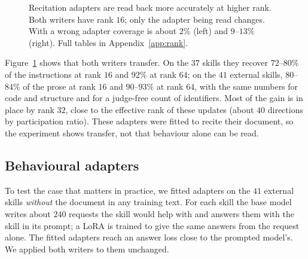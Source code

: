 \documentclass[11pt]{article}
\newcommand{\EWT}{\textsc{EW-T}}
\newcommand{\EWA}{\textsc{EW-A}}
\begin{document}
\begin{figure}[!htb]
\centering
{}
\caption{Recitation adapters are read back more accurately at higher rank. Both writers have rank $16$; only the adapter being read changes. With a wrong
adapter coverage is about $2\%$ (left) and $9$--$13\%$ (right). Full tables in Appendix~\ref{app:rank}.}
\label{fig:rank}
\end{figure}

Figure~\ref{fig:rank} shows that both writers transfer. On the $37$ skills they recover $72$--$80\%$ of the instructions at rank $16$ and $92\%$ at rank $64$; on
the $41$ external skills, $80$--$84\%$ of the prose at rank $16$ and $90$--$93\%$ at rank $64$, with the same numbers for code and structure and for a
judge-free count of identifiers. Most of the gain is in place by rank $32$, close to the effective rank of these updates (about $40$ directions by
participation ratio). These adapters were fitted to recite their document, so the experiment shows transfer, not that behaviour alone can be read.

\subsection{Behavioural adapters}
\label{sec:res-beh}

To test the case that matters in practice, we fitted adapters on the $41$ external skills \emph{without} the document in any training text. For
each skill the base model writes about $240$ requests the skill would help with and answers them with the skill in its prompt; a LoRA is trained to
give the same answers from the request alone. The fitted adapters reach an answer loss close to the prompted model's. We applied both writers to
them unchanged.
\end{document}
